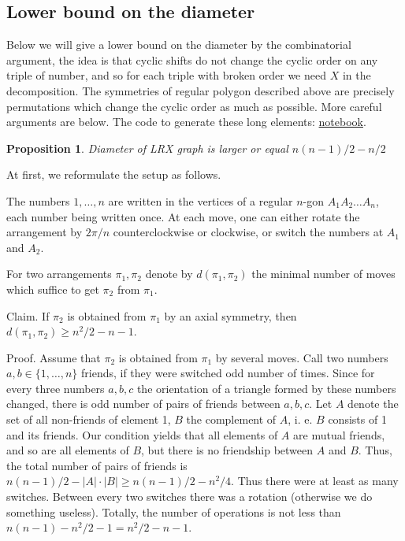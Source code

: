 \documentclass[atmp]{ipart_v1}
\numberwithin{equation}{section}
\theoremstyle{plain}%
\newtheorem{proposition}[theorem]{Proposition}
\begin{document}


\subsection{Lower bound on the diameter}
Below we will give a lower bound on the diameter by the combinatorial argument, the idea is that cyclic shifts do not change the cyclic order on any triple of number, and so for each triple with broken order  we need $X$  in the  decomposition. The symmetries of regular polygon described above are precisely  permutations which change the cyclic order as much as possible. More careful arguments are below. The code to generate these long elements: \href{https://www.kaggle.com/code/alexandervc/lrx-long-elements-f-petrov-oeisa186752}{notebook}. 

\begin{proposition}
    Diameter of LRX graph is larger or equal $n(n-1)/2-n/2$ 
\end{proposition}

At first, we reformulate the setup as follows.

The numbers $1,\ldots,n$  are written in the vertices of a regular $n$-gon $A_1A_2\ldots A_n$, each number being written once. At each move, one can either rotate the arrangement by $2\pi/n$  counterclockwise or clockwise, or switch the numbers at $A_1$ and $A_2$.

For two arrangements $\pi_1,\pi_2$ denote by $d(\pi_1,\pi_2)$ the minimal number of moves which suffice to get $\pi_2$ from $\pi_1$.

Claim. If $\pi_2$ is obtained from $\pi_1$ by an axial symmetry, then $d(\pi_1,\pi_2)\geqslant n^2/2-n-1$.

Proof. Assume that $\pi_2$ is obtained from $\pi_1$ by several moves. Call two numbers $a, b\in \{1,\ldots,n\}$ friends, if they were switched odd number of times. Since for every three numbers $a, b, c$ the orientation of a triangle formed by these numbers changed, there is odd number of pairs of friends between $a, b, c$. Let $A$ denote the set of all non-friends of element 1, $B$ the complement  of $A$, i. e. $B$ consists of 1 and its friends. Our condition yields that all elements of $A$ are mutual friends, and so are all elements of $B$, but there is no friendship between $A$ and $B$. Thus, the total number of pairs of friends is $n(n-1)/2-|A|\cdot |B|\geqslant n(n-1)/2-n^2/4$. Thus there were at least as many switches. Between every two switches there was a rotation (otherwise we do something useless). Totally, the number of operations is not less than $n(n-1)-n^2/2-1=n^2/2-n-1$.
\end{document}
